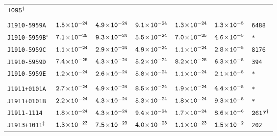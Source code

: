 \begin{longtable}{ l | c | c | c | c | c | l }
\scriptsize{$\tt{1095^{\dagger}}$} \\[-16pt]
\\[-20pt]
\scriptsize{\tt{J1910-5959A}} & \scriptsize{$\tt{1.5\!\times\!10^{-24}}$} & \scriptsize{$\tt{4.9\!\times\!10^{-24}}$} &
\scriptsize{$\tt{9.1\!\times\!10^{-24}}$} &\scriptsize{$\tt{1.3\!\times\!10^{-24}}$} & \scriptsize{$\tt{1.3\!\times\!10^{-5}}$} &
\scriptsize{\tt{6488}} \\[-16pt]
\scriptsize{\tt{J1910-5959B}$^{\diamond}$} & \scriptsize{$\tt{7.1\!\times\!10^{-25}}$} &
\scriptsize{$\tt{9.3\!\times\!10^{-24}}$} & \scriptsize{$\tt{5.5\!\times\!10^{-24}}$} & \scriptsize{$\tt{7.0\!\times\!10^{-25}}$}
& \scriptsize{$\tt{4.6\!\times\!10^{-5}}$} & \scriptsize{\tt{*}} \\[-16pt] 
\scriptsize{\tt{J1910-5959C}} & \scriptsize{$\tt{1.1\!\times\!10^{-24}}$} & \scriptsize{$\tt{2.9\!\times\!10^{-24}}$} &
\scriptsize{$\tt{4.9\!\times\!10^{-24}}$} &\scriptsize{$\tt{1.1\!\times\!10^{-24}}$} & \scriptsize{$\tt{2.8\!\times\!10^{-5}}$} &
\scriptsize{\tt{8176}} \\[-16pt] 
\scriptsize{\tt{J1910-5959D}} & \scriptsize{$\tt{7.4\!\times\!10^{-25}}$} & \scriptsize{$\tt{4.3\!\times\!10^{-24}}$} &
\scriptsize{$\tt{5.2\!\times\!10^{-24}}$} &\scriptsize{$\tt{8.2\!\times\!10^{-25}}$} & \scriptsize{$\tt{6.3\!\times\!10^{-5}}$} &
\scriptsize{\tt{394}} \\[-16pt] 
\scriptsize{\tt{J1910-5959E}} & \scriptsize{$\tt{1.2\!\times\!10^{-24}}$} & \scriptsize{$\tt{2.6\!\times\!10^{-24}}$} &
\scriptsize{$\tt{5.8\!\times\!10^{-24}}$} & \scriptsize{$\tt{1.1\!\times\!10^{-24}}$} & \scriptsize{$\tt{2.1\!\times\!10^{-5}}$} &
\scriptsize{\tt{*}} \\[-16pt]
 \\[-20pt]
\scriptsize{\tt{J1911+0101A}} & \scriptsize{$\tt{2.7\!\times\!10^{-24}}$} & \scriptsize{$\tt{4.9\!\times\!10^{-24}}$} &
\scriptsize{$\tt{8.5\!\times\!10^{-24}}$} & \scriptsize{$\tt{1.9\!\times\!10^{-24}}$} & \scriptsize{$\tt{4.4\!\times\!10^{-5}}$} &
\scriptsize{\tt{*}} \\[-16pt]
\scriptsize{\tt{J1911+0101B}} & \scriptsize{$\tt{2.2\!\times\!10^{-24}}$} & \scriptsize{$\tt{4.3\!\times\!10^{-24}}$} &
\scriptsize{$\tt{5.3\!\times\!10^{-24}}$} & \scriptsize{$\tt{1.8\!\times\!10^{-24}}$} & \scriptsize{$\tt{9.3\!\times\!10^{-5}}$} &
\scriptsize{\tt{*}} \\[-16pt] 
\scriptsize{\tt{J1911-1114}} & \scriptsize{$\tt{1.8\!\times\!10^{-24}}$} & \scriptsize{$\tt{4.3\!\times\!10^{-24}}$} &
\scriptsize{$\tt{9.4\!\times\!10^{-24}}$} & \scriptsize{$\tt{1.7\!\times\!10^{-24}}$} & \scriptsize{$\tt{8.6\!\times\!10^{-6}}$} &
\scriptsize{$\tt{2617^{\dagger}}$} \\[-16pt] 
\scriptsize{\tt{J1913+1011}$^{\ddagger}$} & \scriptsize{$\tt{1.3\!\times\!10^{-23}}$} &
\scriptsize{$\tt{7.5\!\times\!10^{-23}}$} & \scriptsize{$\tt{4.0\!\times\!10^{-23}}$} &\scriptsize{$\tt{1.1\!\times\!10^{-23}}$} &
\scriptsize{$\tt{1.5\!\times\!10^{-2}}$} & \scriptsize{\tt{202}} \\[-16pt] 

\end{longtable}
